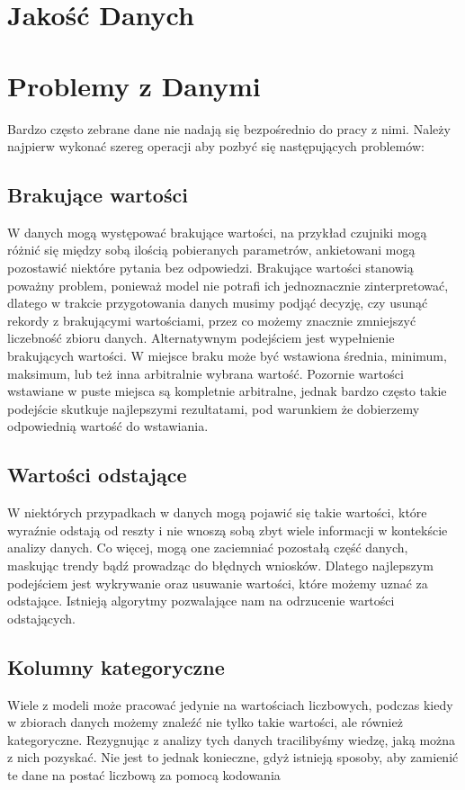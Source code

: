 \documentclass{book}
\begin{document}
\section{Jakość Danych}
\section{Problemy z Danymi}

Bardzo często zebrane dane nie nadają się bezpośrednio do pracy z nimi. 
Należy najpierw wykonać szereg operacji aby pozbyć się następujących 
problemów:   
\subsection{Brakujące wartości}
W danych mogą występować brakujące wartości, na przykład czujniki 
mogą różnić się między sobą ilością pobieranych parametrów, 
ankietowani mogą pozostawić niektóre pytania bez odpowiedzi. 
Brakujące wartości stanowią poważny problem, ponieważ model nie 
potrafi ich jednoznacznie zinterpretować, dlatego w trakcie 
przygotowania danych musimy podjąć decyzję, czy usunąć rekordy z 
brakującymi wartościami, przez co możemy znacznie zmniejszyć 
liczebność zbioru danych. Alternatywnym podejściem jest wypełnienie 
brakujących wartości. W miejsce braku może być wstawiona średnia, 
minimum, maksimum, lub też inna arbitralnie wybrana wartość. 
Pozornie wartości wstawiane w puste miejsca są kompletnie arbitralne, 
jednak bardzo często takie podejście skutkuje najlepszymi rezultatami, 
pod warunkiem że dobierzemy odpowiednią wartość do wstawiania. \cite{missing_values}
\subsection{Wartości odstające}
W niektórych przypadkach w danych mogą pojawić się takie wartości, 
które wyraźnie odstają od reszty i nie wnoszą sobą zbyt wiele 
informacji w kontekście analizy danych. Co więcej, mogą one 
zaciemniać pozostałą część danych, maskując trendy bądź prowadząc 
do błędnych wniosków. Dlatego najlepszym podejściem jest wykrywanie 
oraz usuwanie wartości, które możemy uznać za odstające. 
Istnieją algorytmy pozwalające nam na odrzucenie wartości odstających. \cite{outlier_detection}
\subsection{Kolumny kategoryczne}
Wiele z modeli może pracować jedynie na wartościach liczbowych, 
podczas kiedy w zbiorach danych możemy znaleźć nie tylko takie wartości, 
ale również kategoryczne. Rezygnując z analizy tych danych tracilibyśmy 
wiedzę, jaką można z nich pozyskać. Nie jest to jednak konieczne, 
gdyż istnieją sposoby, aby zamienić te dane na postać liczbową za 
pomocą kodowania \cite{enconding}
\end{document}
